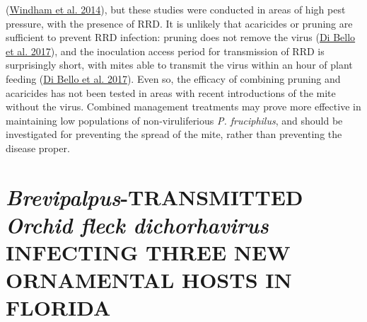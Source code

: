 \documentclass{ufdissertation}[overrideChapters] %
\begin{document}
{(\protect\hyperlink{ref-Windham2014}{Windham et al. 2014}), but these studies were conducted in areas of high pest pressure, with the presence of RRD. It is unlikely that acaricides or pruning are sufficient to prevent RRD infection: pruning does not remove the virus (\protect\hyperlink{ref-Bello2017}{Di Bello et al. 2017}), and the inoculation access period for transmission of RRD is surprisingly short, with mites able to transmit the virus within an hour of plant feeding (\protect\hyperlink{ref-Bello2017}{Di Bello et al. 2017}). Even so, the efficacy of combining pruning and acaricides has not been tested in areas with recent introductions of the mite without the virus. Combined management treatments may prove more effective in maintaining low populations of non-viruliferious \emph{P. fruciphilus}, and should be investigated for preventing the spread of the mite, rather than preventing the disease proper.

\hypertarget{brevipalpus-transmitted-orchid-fleck-dichorhavirus-infecting-three-new-ornamental-hosts-in-florida}{%
\chapter{\texorpdfstring{\emph{Brevipalpus}-TRANSMITTED \emph{Orchid fleck dichorhavirus} INFECTING THREE NEW ORNAMENTAL HOSTS IN FLORIDA}{Brevipalpus-TRANSMITTED Orchid fleck dichorhavirus INFECTING THREE NEW ORNAMENTAL HOSTS IN FLORIDA}}\label{brevipalpus-transmitted-orchid-fleck-dichorhavirus-infecting-three-new-ornamental-hosts-in-florida}}

}
\end{document}
